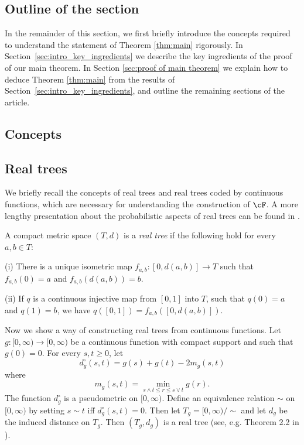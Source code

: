 \subsection*{Outline of the section}
In the remainder of this section, we first briefly introduce the concepts required to understand the statement of Theorem \ref{thm:main} rigorously. In Section~\ref{sec:intro_key_ingredients} we describe the key ingredients of the proof of our main theorem. In Section \ref{sec:proof of main theorem} we explain how  to deduce Theorem \ref{thm:main} from the results of Section~\ref{sec:intro_key_ingredients}, and outline the remaining sections of the article.


\subsection{Concepts}\label{sec:concepts}
\subsection*{Real trees}
We briefly recall the concepts of real trees and real trees coded by continuous functions, which are necessary for understanding the construction of $\cF$. A more lengthy presentation about the probabilistic aspects of real trees can be found in \cite{Evans2008, LeGall2005}.

\begin{dfn}
A compact metric space $(T, d)$ is a {\em real tree} if the following hold for every $a, b\in T$:

(i) There is a unique isometric map $f_{a,b}:[0, d(a,b)]\to T$ such that $f_{a,b}(0)=a$ and $f_{a,b}(d(a,b))=b$.

(ii) If $q$ is a continuous injective map from $[0,1]$ into $T$, such that $q(0)=a$ and $q(1)=b$, we have $q([0,1])=f_{a,b}([0,d(a,b)])$.
\end{dfn}

Now we show a way of constructing real trees from continuous functions. Let $g:[0,\infty)\rightarrow [0,\infty)$ be a continuous function with compact support and such that $g(0)=0$. For every $s, t\ge 0$, let $$d^\circ_g(s,t)=g(s)+g(t)-2m_g(s,t)$$ where $$m_g(s,t)=\min\limits_{s\wedge t\le r\le s\vee t} g(r).$$ The function $d^\circ_g$ is a pseudometric on $[0,\infty)$. Define an equivalence relation $\sim$ on $[0,\infty)$ by setting $s\sim t$ iff $d^\circ_g(s,t)=0$. Then let $T_g=[0,\infty)/\sim$ and let $d_g$ be the induced distance on $T_g$. Then $(T_g, d_g)$ is a real tree (see, e.g. Theorem 2.2 in \cite{LeGall2005}).


